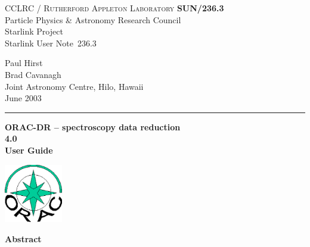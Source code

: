 \documentclass[twoside,11pt]{article}
\newcommand{\stardoccategory}  {Starlink User Note}
\newcommand{\stardocinitials}  {SUN}
\newcommand{\stardocnumber}    {236.3}
\newcommand{\stardocauthors}   {Paul Hirst \\ Brad Cavanagh \\
                                Joint Astronomy Centre, Hilo, Hawaii}
\newcommand{\stardocdate}      {June 2003}
\newcommand{\stardoctitle}     {ORAC-DR -- spectroscopy data reduction}
\newcommand{\stardocversion}   {4.0}
\newcommand{\stardocmanual}    {User Guide}
\newcommand{\stardocname}{\stardocinitials /\stardocnumber}
\newenvironment{latexonly}{}{}
\renewcommand{\_}{\texttt{\symbol{95}}}
\begin{document}
\setcounter{secnumdepth}{5}
\thispagestyle{empty}

\begin{latexonly}
   CCLRC / \textsc{Rutherford Appleton Laboratory} \hfill \textbf{\stardocname}\\
   {\large Particle Physics \& Astronomy Research Council}\\
   {\large Starlink Project\\}
   {\large \stardoccategory\ \stardocnumber}
   \begin{flushright}
   \stardocauthors\\
   \stardocdate
   \end{flushright}
   \vspace{-4mm}
   \rule{\textwidth}{0.5mm}
   \vspace{5mm}
   \begin{center}
   {\Huge\textbf{\stardoctitle \\ [2.5ex]}}
   {\LARGE\textbf{\stardocversion \\ [4ex]}}
   {\Huge\textbf{\stardocmanual}}
   \end{center}
   \vspace{5mm}

\begin{center}
\includegraphics[width=1.0in]{sun236_logo.eps}
\end{center}

   \vspace{10mm}
   \begin{center}
      {\Large\textbf{Abstract}}
   \end{center}
\end{latexonly}
\end{document}
